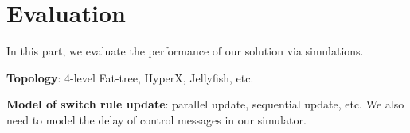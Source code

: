 \section{Evaluation}\label{sec:evaluation}
In this part, we evaluate the performance of our solution via simulations.

\textbf{Topology}: 4-level Fat-tree, HyperX, Jellyfish, etc.

\textbf{Model of switch rule update}: parallel update, sequential update, etc. We also need to model the delay of control messages in our simulator.